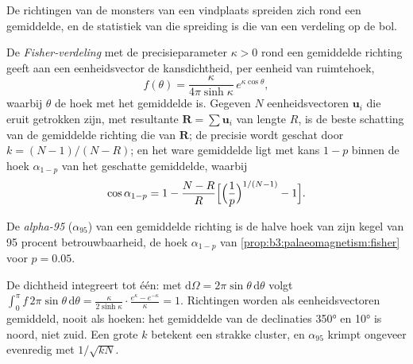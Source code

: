 De richtingen van de monsters van een vindplaats spreiden zich rond een gemiddelde, en
de statistiek van die spreiding is die van een verdeling op de bol.

\begin{proposition}\label{prop:b3:palaeomagnetism:fisher}
De \emph{Fisher-verdeling} met de precisieparameter
$\kappa > 0$ rond een gemiddelde richting geeft aan een eenheidsvector de
kansdichtheid, per eenheid van ruimtehoek,
\[
  f(\theta) = \frac{\kappa}{4\pi\sinh\kappa}\,e^{\kappa\cos\theta},
\]
waarbij $\theta$ de hoek met het gemiddelde is. Gegeven $N$ eenheidsvectoren $\mathbf u_i$
die eruit getrokken zijn, met resultante $\mathbf R = \sum\mathbf u_i$ van lengte $R$, is
de beste schatting van de gemiddelde richting die van $\mathbf R$; de precisie wordt
geschat door $k = (N - 1)/(N - R)$; en het ware gemiddelde ligt met kans
$1 - p$ binnen de hoek $\alpha_{1-p}$ van het geschatte gemiddelde, waarbij
\[
  \cos\alpha_{1-p} = 1 - \frac{N - R}{R}\Bigl[\Bigl(\frac1p\Bigr)^{1/(N-1)} - 1\Bigr].
\]
\end{proposition}
\admitted

\begin{definition}[Alpha-95]\label{def:b3:palaeomagnetism:a95}
De \emph{alpha-95} ($\alpha_{95}$) van een gemiddelde richting is de
halve hoek van zijn kegel van 95 procent betrouwbaarheid, de hoek $\alpha_{1-p}$
van \cref{prop:b3:palaeomagnetism:fisher} voor $p = 0.05$.
\end{definition}

De dichtheid integreert tot één: met $\mathrm d\Omega = 2\pi\sin\theta\,\mathrm
d\theta$ volgt $\int_0^\pi f\,2\pi\sin\theta\,\mathrm d\theta =
\frac{\kappa}{2\sinh\kappa}\cdot\frac{e^\kappa - e^{-\kappa}}{\kappa} = 1$. Richtingen worden als eenheidsvectoren
gemiddeld, nooit als hoeken: het gemiddelde van de declinaties \ang{350} en \ang{10} is
noord, niet zuid. Een grote $k$ betekent een strakke cluster, en $\alpha_{95}$ krimpt
ongeveer evenredig met $1/\sqrt{kN}$.

